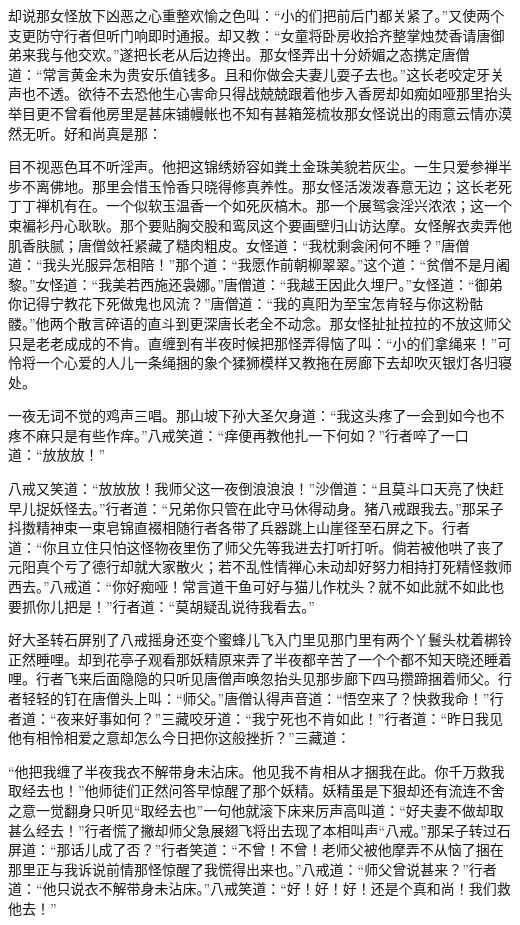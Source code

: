 \documentclass[12pt,UTF8]{ctexbook}
\begin{document}
却说那女怪放下凶恶之心重整欢愉之色叫：“小的们把前后门都关紧了。”又使两个支更防守行者但听门响即时通报。却又教：“女童将卧房收拾齐整掌烛焚香请唐御弟来我与他交欢。”遂把长老从后边搀出。那女怪弄出十分娇媚之态携定唐僧道：“常言黄金未为贵安乐值钱多。且和你做会夫妻儿耍子去也。”这长老咬定牙关声也不透。欲待不去恐他生心害命只得战兢兢跟着他步入香房却如痴如哑那里抬头举目更不曾看他房里是甚床铺幔帐也不知有甚箱笼梳妆那女怪说出的雨意云情亦漠然无听。好和尚真是那：

目不视恶色耳不听淫声。他把这锦绣娇容如粪土金珠美貌若灰尘。一生只爱参禅半步不离佛地。那里会惜玉怜香只晓得修真养性。那女怪活泼泼春意无边；这长老死丁丁禅机有在。一个似软玉温香一个如死灰槁木。那一个展鸳衾淫兴浓浓；这一个束褊衫丹心耿耿。那个要贴胸交股和鸾凤这个要画壁归山访达摩。女怪解衣卖弄他肌香肤腻；唐僧敛衽紧藏了糙肉粗皮。女怪道：“我枕剩衾闲何不睡？”唐僧道：“我头光服异怎相陪！”那个道：“我愿作前朝柳翠翠。”这个道：“贫僧不是月阇黎。”女怪道：“我美若西施还袅娜。”唐僧道：“我越王因此久埋尸。”女怪道：“御弟你记得宁教花下死做鬼也风流？”唐僧道：“我的真阳为至宝怎肯轻与你这粉骷髅。”他两个散言碎语的直斗到更深唐长老全不动念。那女怪扯扯拉拉的不放这师父只是老老成成的不肯。直缠到有半夜时候把那怪弄得恼了叫：“小的们拿绳来！”可怜将一个心爱的人儿一条绳捆的象个猱狮模样又教拖在房廊下去却吹灭银灯各归寝处。

一夜无词不觉的鸡声三唱。那山坡下孙大圣欠身道：“我这头疼了一会到如今也不疼不麻只是有些作痒。”八戒笑道：“痒便再教他扎一下何如？”行者啐了一口道：“放放放！”

八戒又笑道：“放放放！我师父这一夜倒浪浪浪！”沙僧道：“且莫斗口天亮了快赶早儿捉妖怪去。”行者道：“兄弟你只管在此守马休得动身。猪八戒跟我去。”那呆子抖擞精神束一束皂锦直裰相随行者各带了兵器跳上山崖径至石屏之下。行者道：“你且立住只怕这怪物夜里伤了师父先等我进去打听打听。倘若被他哄了丧了元阳真个亏了德行却就大家散火；若不乱性情禅心未动却好努力相持打死精怪救师西去。”八戒道：“你好痴哑！常言道干鱼可好与猫儿作枕头？就不如此就不如此也要抓你儿把是！”行者道：“莫胡疑乱说待我看去。”

好大圣转石屏别了八戒摇身还变个蜜蜂儿飞入门里见那门里有两个丫鬟头枕着梆铃正然睡哩。却到花亭子观看那妖精原来弄了半夜都辛苦了一个个都不知天晓还睡着哩。行者飞来后面隐隐的只听见唐僧声唤忽抬头见那步廊下四马攒蹄捆着师父。行者轻轻的钉在唐僧头上叫：“师父。”唐僧认得声音道：“悟空来了？快救我命！”行者道：“夜来好事如何？”三藏咬牙道：“我宁死也不肯如此！”行者道：“昨日我见他有相怜相爱之意却怎么今日把你这般挫折？”三藏道：

“他把我缠了半夜我衣不解带身未沾床。他见我不肯相从才捆我在此。你千万救我取经去也！”他师徒们正然问答早惊醒了那个妖精。妖精虽是下狠却还有流连不舍之意一觉翻身只听见“取经去也”一句他就滚下床来厉声高叫道：“好夫妻不做却取甚么经去！”行者慌了撇却师父急展翅飞将出去现了本相叫声“八戒。”那呆子转过石屏道：“那话儿成了否？”行者笑道：“不曾！不曾！老师父被他摩弄不从恼了捆在那里正与我诉说前情那怪惊醒了我慌得出来也。”八戒道：“师父曾说甚来？”行者道：“他只说衣不解带身未沾床。”八戒笑道：“好！好！好！还是个真和尚！我们救他去！”
\end{document}
